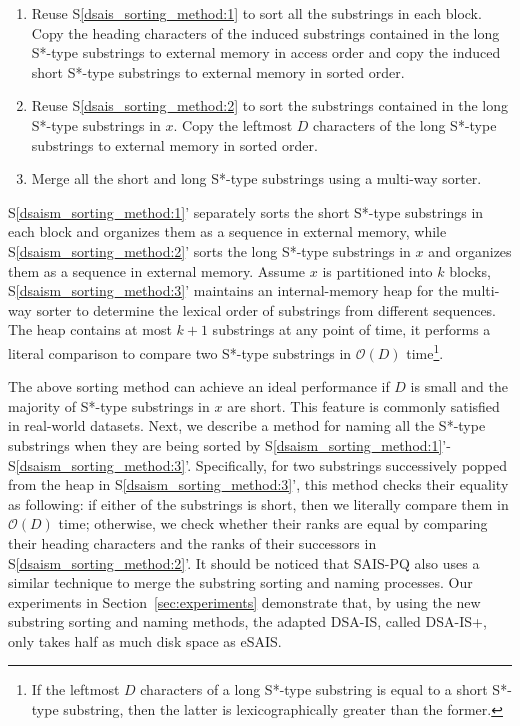 \documentclass[10pt,journal,compsoc]{IEEEtran}
\begin{document}
\begin{enumerate}[S1']
	\item Reuse S\ref{dsais_sorting_method:1} to sort all the substrings in each block. Copy the heading characters of the induced substrings contained in the long S*-type substrings to external memory in access order and copy the induced short S*-type substrings to external memory in sorted order.~\label{dsaism_sorting_method:1}
		
	\item Reuse S\ref{dsais_sorting_method:2} to sort the substrings contained in the long S*-type substrings in $x$. Copy the leftmost $D$ characters of the long S*-type substrings to external memory in sorted order.~\label{dsaism_sorting_method:2}
	
	\item Merge all the short and long S*-type substrings using a multi-way sorter.~\label{dsaism_sorting_method:3}
\end{enumerate}

S\ref{dsaism_sorting_method:1}' separately sorts the short S*-type substrings in each block and organizes them as a sequence in external memory, while S\ref{dsaism_sorting_method:2}' sorts the long S*-type substrings in $x$ and organizes them as a sequence in external memory. Assume $x$ is partitioned into $k$ blocks, S\ref{dsaism_sorting_method:3}' maintains an internal-memory heap for the multi-way sorter to determine the lexical order of substrings from different sequences. The heap contains at most $k + 1$ substrings at any point of time, it performs a literal comparison to compare two S*-type substrings in $\mathcal{O}(D)$ time\footnote{If the leftmost $D$ characters of a long S*-type substring is equal to a short S*-type substring, then the latter is lexicographically greater than the former.}. 

The above sorting method can achieve an ideal performance if $D$ is small and the majority of S*-type substrings in $x$ are short. This feature is commonly satisfied in real-world datasets. Next, we describe a method for naming all the S*-type substrings when they are being sorted by S\ref{dsaism_sorting_method:1}'-S\ref{dsaism_sorting_method:3}'. Specifically, for two substrings successively popped from the heap in S\ref{dsaism_sorting_method:3}', this method checks their equality as following: if either of the substrings is short, then we literally compare them in $\mathcal{O}(D)$ time; otherwise, we check whether their ranks are equal by comparing their heading characters and the ranks of their successors in S\ref{dsaism_sorting_method:2}'. It should be noticed that SAIS-PQ also uses a similar technique to merge the substring sorting and naming processes. Our experiments in Section~\ref{sec:experiments} demonstrate that, by using the new substring sorting and naming methods, the adapted DSA-IS, called DSA-IS+, only takes half as much disk space as eSAIS.
\end{document}
